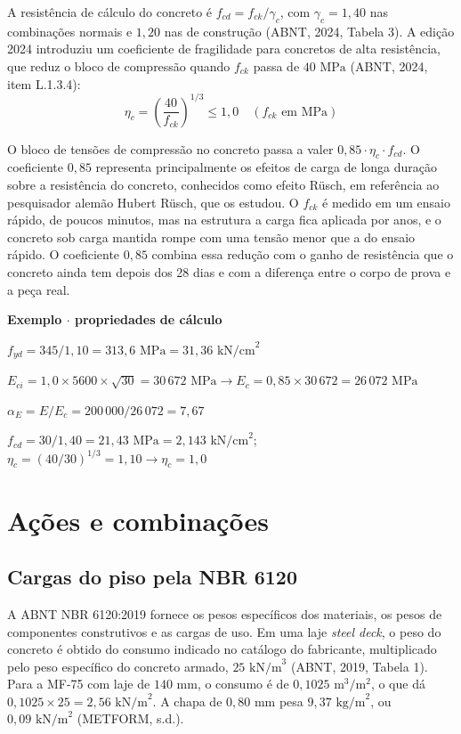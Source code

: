 \documentclass[11pt,a4paper]{article}
\newcommand{\caixaexemplo}[2]{%
  \par\vspace{6pt}\noindent\colorbox{examplebg}{%
    \parbox{\dimexpr\linewidth-2\fboxsep\relax}{%
      \vspace{4pt}\textbf{\color{exampleaccent}#1}\par\vspace{3pt}#2\vspace{4pt}%
    }%
  }\par\vspace{6pt}%
}
\begin{document}
A resistência de cálculo do concreto é $f_{cd} = f_{ck}/\gamma_c$, com $\gamma_c = 1{,}40$ nas combinações normais e $1{,}20$ nas de construção (ABNT, 2024, Tabela 3). A edição 2024 introduziu um coeficiente de fragilidade para concretos de alta resistência, que reduz o bloco de compressão quando $f_{ck}$ passa de $40\text{ MPa}$ (ABNT, 2024, item L.1.3.4):
\begin{equation}
  \eta_c = \left(\frac{40}{f_{ck}}\right)^{1/3} \le 1{,}0 \quad (f_{ck}\text{ em MPa})
  \label{eq:etac}
\end{equation}

O bloco de tensões de compressão no concreto passa a valer $0{,}85\cdot\eta_c\cdot f_{cd}$. O coeficiente $0{,}85$ representa principalmente os efeitos de carga de longa duração sobre a resistência do concreto, conhecidos como efeito Rüsch, em referência ao pesquisador alemão Hubert Rüsch, que os estudou. O $f_{ck}$ é medido em um ensaio rápido, de poucos minutos, mas na estrutura a carga fica aplicada por anos, e o concreto sob carga mantida rompe com uma tensão menor que a do ensaio rápido. O coeficiente $0{,}85$ combina essa redução com o ganho de resistência que o concreto ainda tem depois dos 28 dias e com a diferença entre o corpo de prova e a peça real.

\caixaexemplo{Exemplo $\cdot$ propriedades de cálculo}{%
$f_{yd} = 345/1{,}10 = 313{,}6\text{ MPa} = 31{,}36\text{ kN/cm}^2$\par
$E_{ci} = 1{,}0 \times 5600 \times \sqrt{30} = 30\,672\text{ MPa} \rightarrow E_c = 0{,}85 \times 30\,672 = 26\,072\text{ MPa}$\par
$\alpha_E = E/E_c = 200\,000/26\,072 = 7{,}67$\par
$f_{cd} = 30/1{,}40 = 21{,}43\text{ MPa} = 2{,}143\text{ kN/cm}^2$; $\eta_c = (40/30)^{1/3} = 1{,}10 \rightarrow \eta_c = 1{,}0$}

\section{Ações e combinações}

\subsection{Cargas do piso pela NBR 6120}

A ABNT NBR 6120:2019 fornece os pesos específicos dos materiais, os pesos de componentes construtivos e as cargas de uso. Em uma laje \textit{steel deck}, o peso do concreto é obtido do consumo indicado no catálogo do fabricante, multiplicado pelo peso específico do concreto armado, $25\text{ kN/m}^3$ (ABNT, 2019, Tabela 1). Para a MF-75 com laje de $140\text{ mm}$, o consumo é de $0{,}1025\text{ m}^3/\text{m}^2$, o que dá $0{,}1025 \times 25 = 2{,}56\text{ kN/m}^2$. A chapa de $0{,}80\text{ mm}$ pesa $9{,}37\text{ kg/m}^2$, ou $0{,}09\text{ kN/m}^2$ (METFORM, s.d.).
\end{document}
